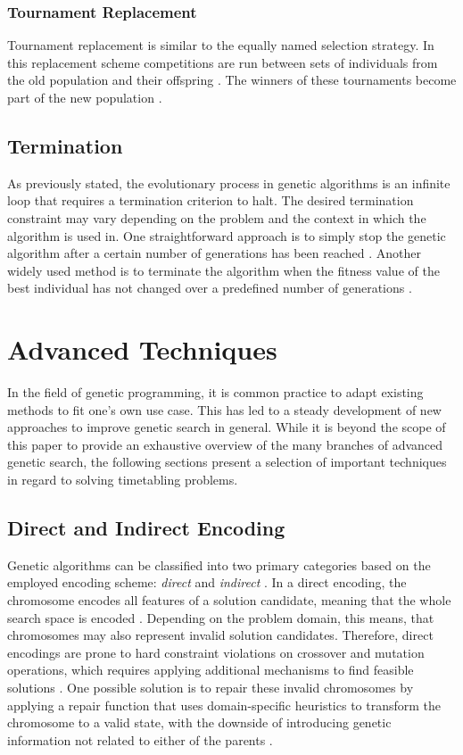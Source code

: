 \documentclass[sigconf]{acmart}
\begin{document}
\subsubsection{Tournament Replacement}
Tournament replacement is similar to the equally named selection strategy.
In this replacement scheme competitions are run between sets of individuals
from the old population and their offspring \cite{Affenzeller2009}.
The winners of these tournaments become part of the new population
\cite{Affenzeller2009}.


\subsection{Termination}
As previously stated, the evolutionary process in genetic algorithms is
an infinite loop that requires a termination criterion to halt.
The desired termination constraint may vary depending on the problem and the
context in which the algorithm is used in.
One straightforward approach is to simply stop the genetic algorithm after a
certain number of generations has been reached \cite{Beligiannis2009}.
Another widely used method is to terminate the algorithm when the fitness value
of the best individual has not changed over a predefined number of
generations \cite{Carr2014}.


\section{Advanced Techniques}
In the field of genetic programming, it is common practice to adapt existing
methods to fit one's own use case. This has led to a steady development of new
approaches to improve genetic search in general.
While it is beyond the scope of this paper to provide an exhaustive overview
of the many branches of advanced genetic search,
the following sections present a selection of important techniques in regard to
solving timetabling problems.

\subsection{Direct and Indirect Encoding}
Genetic algorithms can be classified into two primary categories based on the
employed encoding scheme: \textit{direct} and \textit{indirect}
\cite{Thanh2007}.
In a direct encoding, the chromosome encodes all features of a solution
candidate, meaning that the whole search space is encoded
\cite{Thanh2007,Goos2002}.
Depending on the problem domain, this means, that chromosomes may also
represent invalid solution candidates. Therefore, direct encodings are prone
to hard constraint violations on crossover and mutation operations, which
requires applying additional mechanisms to find feasible solutions
\cite{Goos2002}.
One possible solution is to repair these invalid
chromosomes by applying a repair function that uses domain-specific
heuristics to transform the chromosome to a valid state, with the downside of
introducing genetic information not related to either of the parents
\cite{Beligiannis2009,Affenzeller2009}.
\end{document}
